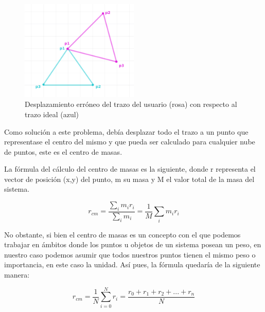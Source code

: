 \vspace{0.5cm}

\begin{figure}[htbp]
\centering
  \includegraphics[width=0.5\textwidth]{archivos/not_center_of_mass.png}
  \caption{Desplazamiento erróneo del trazo del usuario (rosa) con respecto al trazo ideal (azul)}
  \label{fig:not_center_of_mass}
\end{figure}


\vspace{0.5cm}

Como solución a este problema, debía desplazar todo el trazo a un punto que representase el centro del mismo y que pueda ser calculado para cualquier nube de puntos, este es el centro de masas.

\vspace{0.5cm}

La fórmula del cálculo del centro de masas es la siguiente, donde r representa el vector de posición (x,y) del punto, m su masa y M el valor total de la masa del sistema.

\vspace{0.5cm}

 \begin{equation}
r_{cm} = \frac{\sum _i m_ir_i}{\sum _i m_i} = \frac{1}{M} \sum_{i} m_ir_i
\end{equation}

\vspace{0.5cm}

 No obstante, si bien el centro de masas es un concepto con el que podemos trabajar en ámbitos donde los puntos u objetos de un sistema posean un peso, en nuestro caso podemos asumir que todos nuestros puntos tienen el mismo peso o importancia, en este caso la unidad. Así pues, la fórmula quedaría de la siguiente manera:
 
 \vspace{0.5cm}
 
 \begin{equation}
r_{cm} =\frac{1}{N} \sum_{i = 0}^{N} r_i = \frac{r_0+r_1+r_2+...+r_n}{N} 
\end{equation}
 
